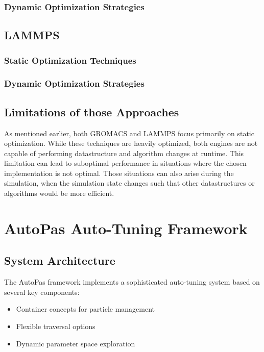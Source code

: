 \documentclass[conference]{IEEEtran}
\begin{document}
\subsubsection{Dynamic Optimization Strategies}




\subsection{LAMMPS}

\subsubsection{Static Optimization Techniques}


\subsubsection{Dynamic Optimization Strategies}



\subsection*{Limitations of those Approaches}

As mentioned earlier, both GROMACS and LAMMPS focus primarily on static optimization. While these techniques are heavily optimized, both engines are not capable of performing datastructure and algorithm changes at runtime. This limitation can lead to suboptimal performance in situations where the chosen implementation is not optimal. Those situations can also arise during the simulation, when the simulation state changes such that other datastructures or algorithms would be more efficient.


\section{AutoPas Auto-Tuning Framework}
\subsection{System Architecture}
The AutoPas framework implements a sophisticated auto-tuning system based on several key components:

\begin{itemize}
    \item Container concepts for particle management
    \item Flexible traversal options
    \item Dynamic parameter space exploration
\end{itemize}
\end{document}
